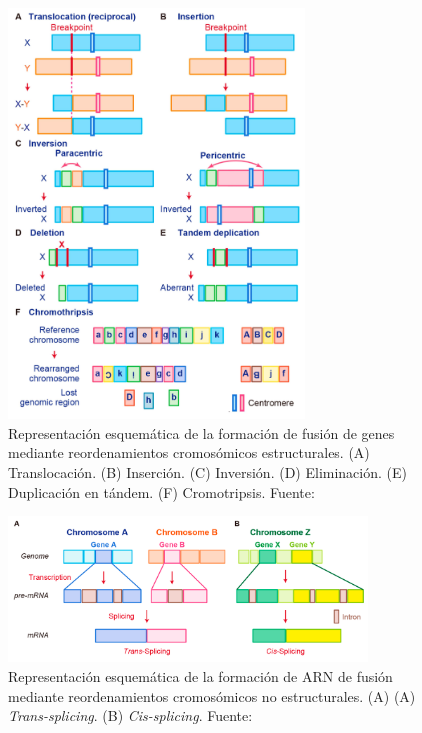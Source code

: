 \begin{figure}[h]
	\centering
	\includegraphics[width=0.7\textwidth]{../img/theory/fusion_gene}
	\caption[Representación de la fusión de genes.]{Representación esquemática de la formación de fusión de genes mediante reordenamientos cromosómicos estructurales. (A) Translocación. (B) Inserción. (C) Inversión. (D) Eliminación. (E) Duplicación en tándem. (F) Cromotripsis. Fuente: \cite{taniue2021fusion}}
	\label{fig:fusion}
\end{figure}


\begin{figure}[h]
	\centering
	\includegraphics[width=0.85\textwidth]{../img/theory/fusion_gene2}
	\caption[Representación de \textit{Trans-splicing} y \textit{Cis-splicing}.]{Representación esquemática de la formación de ARN de fusión mediante reordenamientos cromosómicos no estructurales. (A) (A) \textit{Trans-splicing}. (B) \textit{Cis-splicing}. Fuente: \cite{taniue2021fusion}}
	\label{fig:fusion2}
\end{figure}


